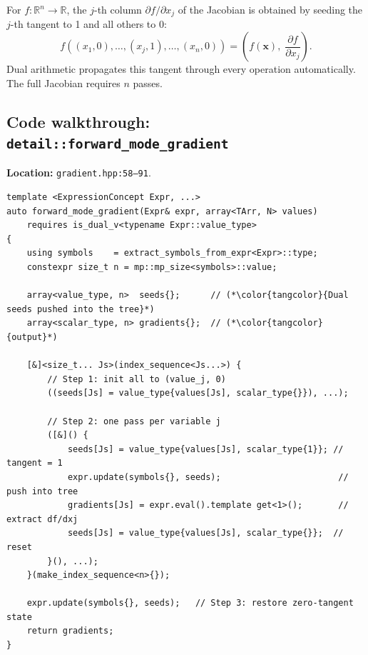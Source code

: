 \documentclass[11pt,a4paper]{article}
\newcommand{\pf}[2]{\dfrac{\partial #1}{\partial #2}}
\begin{document}
For $f:\mathbb{R}^n\to\mathbb{R}$, the $j$-th column $\partial f/\partial x_j$
of the Jacobian is obtained by seeding the $j$-th tangent to 1 and all others
to 0:
\[
  f\!\left((x_1,0),\ldots,(x_j,1),\ldots,(x_n,0)\right)
  = \!\left(f(\mathbf{x}),\;\pf{f}{x_j}\right).
\]
Dual arithmetic propagates this tangent through every operation automatically.
The full Jacobian requires $n$ passes.

\subsection{Code walkthrough: \texttt{detail::forward\_mode\_gradient}}
\label{sec:fwdcode}

\textbf{Location:} \texttt{gradient.hpp:58--91}.

\begin{lstlisting}
template <ExpressionConcept Expr, ...>
auto forward_mode_gradient(Expr& expr, array<TArr, N> values)
    requires is_dual_v<typename Expr::value_type>
{
    using symbols    = extract_symbols_from_expr<Expr>::type;
    constexpr size_t n = mp::mp_size<symbols>::value;

    array<value_type, n>  seeds{};      // (*\color{tangcolor}{Dual seeds pushed into the tree}*)
    array<scalar_type, n> gradients{};  // (*\color{tangcolor}{output}*)

    [&]<size_t... Js>(index_sequence<Js...>) {
        // Step 1: init all to (value_j, 0)
        ((seeds[Js] = value_type{values[Js], scalar_type{}}), ...);

        // Step 2: one pass per variable j
        ([&]() {
            seeds[Js] = value_type{values[Js], scalar_type{1}}; // tangent = 1
            expr.update(symbols{}, seeds);                       // push into tree
            gradients[Js] = expr.eval().template get<1>();       // extract df/dxj
            seeds[Js] = value_type{values[Js], scalar_type{}};  // reset
        }(), ...);
    }(make_index_sequence<n>{});

    expr.update(symbols{}, seeds);   // Step 3: restore zero-tangent state
    return gradients;
}
\end{lstlisting}
\end{document}
